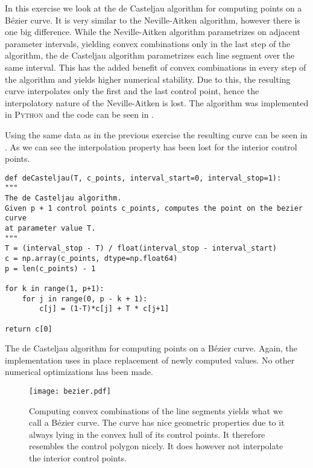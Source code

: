 \documentclass[12pt, article, oneside]{memoir}
\begin{document}
In this exercise we look at the de Casteljau algorithm for computing points
on a B\'ezier curve. It is very similar to the Neville-Aitken algorithm,
however there is one big difference.  While the Neville-Aitken algorithm
parametrizes on adjacent parameter intervals, yielding convex combinations
only in the last step of the algorithm, the de Casteljau algorithm
parametrizes each line segment over the same interval. This has the added
benefit of convex combinations in every step of the algorithm and yields
higher numerical stability. Due to this, the resulting curve interpolates
only the first and the last control point, hence the interpolatory nature
of the Neville-Aitken is lost. The algorithm was implemented in \textsc{Python}
and the code can be seen in .

Using the same data as in the previous exercise the resulting curve can be
seen in . As we can see the interpolation property has
been lost for the interior control points.

\begin{listing}[tbp]
    \begin{verbatim}
def deCasteljau(T, c_points, interval_start=0, interval_stop=1):
"""
The de Casteljau algorithm.
Given p + 1 control points c_points, computes the point on the bezier curve
at parameter value T.
"""
T = (interval_stop - T) / float(interval_stop - interval_start)
c = np.array(c_points, dtype=np.float64)
p = len(c_points) - 1

for k in range(1, p+1):
    for j in range(0, p - k + 1):
        c[j] = (1-T)*c[j] + T * c[j+1]

return c[0]
    \end{verbatim} 
    \caption{The de Casteljau algorithm for computing points on a B\'ezier
    curve. Again, the implementation uses in place replacement of newly
computed values. No other numerical optimizations has been made.}
\label{lst:decasteljau}
\end{listing}

\begin{figure}[tbp]
    \centering
    \texttt{[image: bezier.pdf]}
    \caption{Computing convex combinations of the line segments yields what
        we call a B\'ezier curve. The curve has nice geometric properties
        due to it always lying in the convex hull of its control points. It
        therefore resembles the control polygon nicely. It does however not
        interpolate the interior control points.}
    \label{fig:bezier}
\end{figure}
\end{document}
